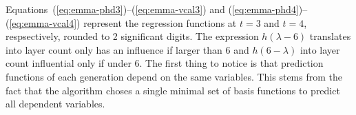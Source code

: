 Equations~(\ref{eq:emma-phd3})--(\ref{eq:emma-vcal3}) and (\ref{eq:emma-phd4})--(\ref{eq:emma-vcal4}) represent the regression functions at $t=3$ and $t=4$, respsectively, rounded to 2 significant digits.
The expression $h(\lambda-6)$ translates into layer count only has an influence if larger than 6 
and $h(6-\lambda)$ into layer count influential only if under 6.
%
The first thing to notice is that prediction functions of each generation depend on the same variables. 
This stems from the fact that the algorithm choses a single minimal set of basis functions to predict all dependent variables. 
%

